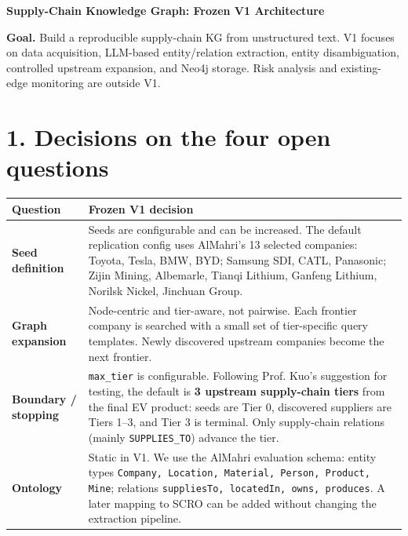 \documentclass[10pt,a4paper]{article}
\begin{document}
{\sffamily\bfseries\fontsize{17}{19}\selectfont\color{MainBlue}
Supply-Chain Knowledge Graph: Frozen V1 Architecture}

\vspace{1mm}
\begin{briefbox}
\small
\textbf{Goal.} Build a reproducible supply-chain KG from unstructured text. V1 focuses on data acquisition, LLM-based entity/relation extraction, entity disambiguation, controlled upstream expansion, and Neo4j storage. Risk analysis and existing-edge monitoring are outside V1.
\end{briefbox}

\section{1. Decisions on the four open questions}

\small
\begin{tabularx}{\textwidth}{>{\bfseries\sffamily}p{} X}
\toprule
Question & Frozen V1 decision \\
\midrule
Seed definition &
Seeds are configurable and can be increased. The default replication config uses AlMahri's 13 selected companies: Toyota, Tesla, BMW, BYD; Samsung SDI, CATL, Panasonic; Zijin Mining, Albemarle, Tianqi Lithium, Ganfeng Lithium, Norilsk Nickel, Jinchuan Group. \\

Graph expansion &
Node-centric and tier-aware, not pairwise. Each frontier company is searched with a small set of tier-specific query templates. Newly discovered upstream companies become the next frontier. \\

Boundary / stopping &
\texttt{max\_tier} is configurable. Following Prof. Kuo's suggestion for testing, the default is \textbf{3 upstream supply-chain tiers} from the final EV product: seeds are Tier 0, discovered suppliers are Tiers 1--3, and Tier 3 is terminal. Only supply-chain relations (mainly \texttt{SUPPLIES\_TO}) advance the tier. \\

Ontology &
Static in V1. We use the AlMahri evaluation schema: entity types \texttt{Company, Location, Material, Person, Product, Mine}; relations \texttt{suppliesTo, locatedIn, owns, produces}. A later mapping to SCRO can be added without changing the extraction pipeline. \\
\bottomrule
\end{tabularx}
\end{document}
